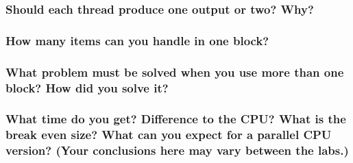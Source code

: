 \documentclass[a4paper,12pt]{article}
\begin{document}
\subsubsection{Should each thread produce one output or two? Why?}



\subsubsection{How many items can you handle in one block?}


\subsubsection{What problem must be solved when you use more than one block? How did you solve it?}


\subsubsection{What time do you get? Difference to the CPU? What is the break even size? What can you expect for a parallel CPU version? (Your conclusions here may vary between the labs.)}
\end{document}
